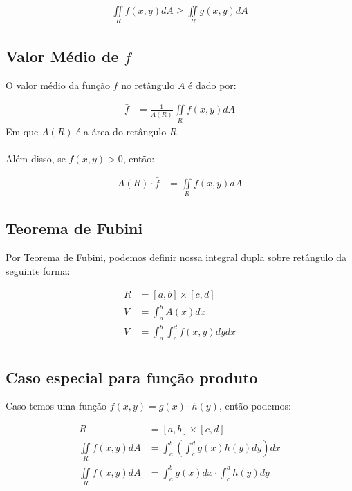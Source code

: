 \documentclass{article}
\newcommand{\doubleint}[1] {\iint\limits_R #1 dA}
\begin{document}
            \begin{align*}
                \doubleint{f(x,y)} \geq \doubleint{g(x,y)}
            \end{align*}

        \subsection{Valor Médio de $f$}
            O valor médio da função $f$ no retângulo $A$ é dado por:

            \begin{align*}
                \bar{f} &= \frac{1}{A(R)} \doubleint{f(x,y)}
            \end{align*}
            Em que $A(R)$ é a área do retângulo $R$.
            
            \paragraph{}
            Além disso, se $f(x,y) > 0$, então:
            
            \begin{align*}
                A(R) \cdot \bar{f} &= \doubleint{f(x,y)}
            \end{align*}

        \subsection{Teorema de Fubini}
            Por Teorema de Fubini, podemos definir nossa integral dupla sobre retângulo
            da seguinte forma:

            \begin{align*}
                R &= [a,b] \times [c, d]\\
                V &= \int_a^b A(x) dx\\
                V &= \int_a^b \int_c^d f(x,y) dy dx\\
            \end{align*}

        \subsection{Caso especial para função produto}
            Caso temos uma função $f(x,y) = g(x) \cdot h(y)$, então podemos:

            \begin{align*}
                R &= [a,b] \times [c,d]\\
                \doubleint{f(x,y)} &= \int_a^b \left( \int_c^d g(x) h(y) dy \right) dx\\
                \doubleint{f(x,y)} &= \int_a^b g(x) dx \cdot \int_c^d h(y) dy
            \end{align*}
\end{document}
